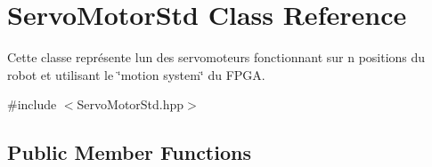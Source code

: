 \hypertarget{classServoMotorStd}{}\section{Servo\+Motor\+Std Class Reference}
\label{classServoMotorStd}


Cette classe représente l\textquotesingle{}un des servomoteurs fonctionnant sur n positions du robot et utilisant le \char`\"{}motion system\char`\"{} du F\+P\+GA.  




{\ttfamily \#include $<$Servo\+Motor\+Std.\+hpp$>$}

\subsection*{Public Member Functions}
